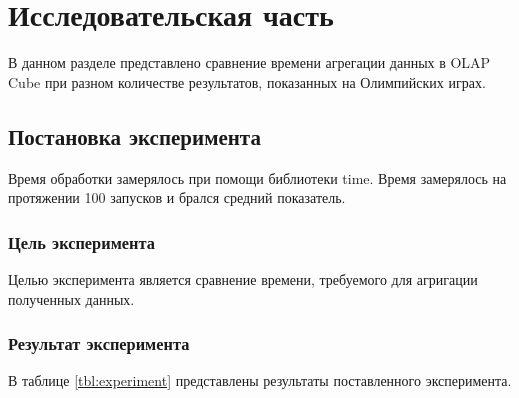 \chapter{Исследовательская часть}

В данном разделе представлено сравнение времени агрегации данных в OLAP Cube при разном количестве результатов, показанных на Олимпийских играх.

\section{Постановка эксперимента}

Время обработки замерялось при помощи библиотеки time. Время замерялось на протяжении 100 запусков и брался средний показатель.

\subsection{Цель эксперимента}

Целью эксперимента является сравнение времени, требуемого для агригации полученных данных.

\subsection{Результат эксперимента}

В таблице \ref{tbl:experiment} представлены результаты поставленного эксперимента.

